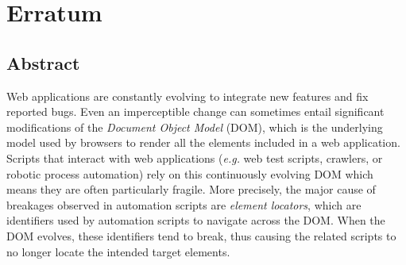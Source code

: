 \chapter{Erratum}\label{chap:erratum}
\section{Abstract}

Web applications are constantly evolving to integrate new features and fix reported bugs.
Even an imperceptible change can sometimes entail significant modifications of the \emph{Document Object Model} (DOM), which is the underlying model used by browsers to render all the elements included in a web application.
Scripts that interact with web applications (\emph{e.g.} web test scripts, crawlers, or robotic process automation) rely on this continuously evolving DOM which means they are often particularly fragile.
More precisely, the major cause of breakages observed in automation scripts are \emph{element locators}, which are identifiers used by automation scripts to navigate across the DOM. When the DOM evolves, these identifiers tend to break, thus causing the related scripts to no longer locate the intended target elements.

